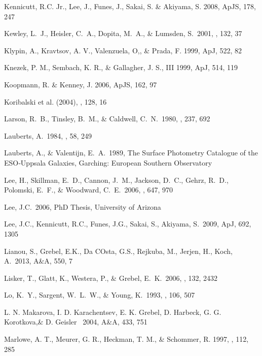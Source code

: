 \documentclass[12pt,preprint]{emulateapj}
\begin{document}
\begin{thebibliography}{}
Kennicutt, R.C. Jr., Lee, J., Funes, J., Sakai, S. \& Akiyama, S. 2008, ApJS, 178, 247

Kewley, L.~J., Heisler, C.~A., Dopita, M.~A., \& Lumsden, S.\ 2001, \apjs, 132, 37 

Klypin, A., Kravtsov, A. V., Valenzuela, O,, \& Prada, F. 1999, ApJ, 522, 82

Knezek, P. M., Sembach, K. R., \& Gallagher, J. S., III 1999, ApJ, 514, 119

Koopmann, R. \& Kenney, J. 2006, ApJS, 162, 97

Koribalski et al. (2004),  \aj, 128, 16

Larson, R.~B., Tinsley, B.~M., \& Caldwell, C.~N.\ 1980, \apj, 237, 692 

Lauberts, A.\ 1984, \aaps, 58, 249 

Lauberts, A., \& Valentijn, E.~A.\ 1989,
The Surface Photometry Catalogue of the ESO‐Uppsala Galaxies,
Garching: European Southern Observatory  

Lee, H., Skillman, E.~D., Cannon, J.~M., Jackson, D.~C., Gehrz, R.~D., 
Polomski, E.~F., \& Woodward, C.~E.\ 2006, \apj, 647, 970 

Lee, J.C.\ 2006, PhD Thesis, University of Arizona

Lee, J.C., Kennicutt, R.C., Funes, J.G., Sakai, S., Akiyama, S.\ 2009, ApJ, 692, 1305

Lianou, S., Grebel, E.K., Da COsta, G.S., Rejkuba, M., Jerjen, H., Koch, A.\ 2013, A\&A, 550, 7

Lisker, T., Glatt, K., Westera, P., \& Grebel, E.~K.\ 2006, \aj, 132, 2432

Lo, K.~Y., Sargent, W.~L.~W., \& Young, K.\ 1993, \aj, 106, 507 

L. N. Makarova, I. D. Karachentsev, E. K. Grebel, D. Harbeck, G. G. Korotkova,\&
D. Geisler \ 2004, A\&A, 433, 751

Marlowe, A. T., Meurer, G. R., Heckman, T. M., \& Schommer, R. 1997, 
\apjs , 112, 285


\end{thebibliography}
\end{document}
